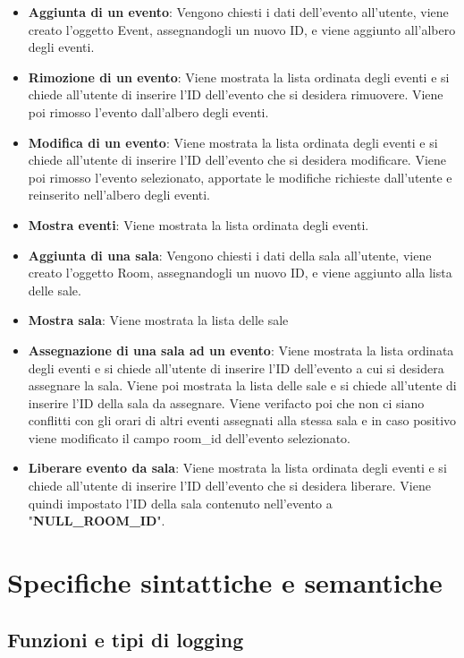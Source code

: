 \documentclass[11pt]{scrartcl} %
\begin{document}
\begin{itemize}
    \item \textbf{Aggiunta di un evento}: Vengono chiesti i dati dell'evento all'utente, viene creato l'oggetto Event, assegnandogli un nuovo ID, e viene aggiunto all'albero degli eventi. 
    \item \textbf{Rimozione di un evento}: Viene mostrata la lista ordinata degli eventi e si chiede all'utente di inserire l'ID dell'evento che si desidera rimuovere. Viene poi rimosso l'evento dall'albero degli eventi.
    \item \textbf{Modifica di un evento}: Viene mostrata la lista ordinata degli eventi e si chiede all'utente di inserire l'ID dell'evento che si desidera modificare. Viene poi rimosso l'evento selezionato, apportate le modifiche richieste dall'utente e reinserito nell'albero degli eventi.
    \item \textbf{Mostra eventi}: Viene mostrata la lista ordinata degli eventi.
    \item \textbf{Aggiunta di una sala}: Vengono chiesti i dati della sala all'utente, viene creato l'oggetto Room, assegnandogli un nuovo ID, e viene aggiunto alla lista delle sale.
    \item \textbf{Mostra sala}: Viene mostrata la lista delle sale
    \item \textbf{Assegnazione di una sala ad un evento}: Viene mostrata la lista ordinata degli eventi e si chiede all'utente di inserire l'ID dell'evento a cui si desidera assegnare la sala. Viene poi mostrata la lista delle sale e si chiede all'utente di inserire l'ID della sala da assegnare. Viene verifacto poi che non ci siano conflitti con gli orari di altri eventi assegnati alla stessa sala e in caso positivo viene modificato il campo room\_id dell'evento selezionato.
    \item \textbf{Liberare evento da sala}: Viene mostrata la lista ordinata degli eventi e si chiede all'utente di inserire l'ID dell'evento che si desidera liberare. Viene quindi impostato l'ID della sala contenuto nell'evento a "\textbf{NULL\_ROOM\_ID}".
    
\end{itemize}


\section{Specifiche sintattiche e semantiche}

\subsection{Funzioni e tipi di logging}
\end{document}

